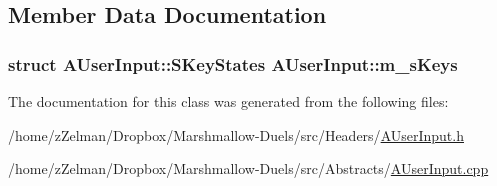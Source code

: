 \subsection{Member Data Documentation}
\hypertarget{classAUserInput_a55b881326b920413bbcdf6e02c4fb021}{
\subsubsection[{m\-\_\-s\-Keys}]{\setlength{\rightskip}{0pt plus 5cm}struct {\bf A\-User\-Input\-::\-S\-Key\-States}  A\-User\-Input\-::m\-\_\-s\-Keys\hspace{0.3cm}{\ttfamily [protected]}}}\label{classAUserInput_a55b881326b920413bbcdf6e02c4fb021}


The documentation for this class was generated from the following files\-:\begin{DoxyCompactItemize}
\item 
/home/z\-Zelman/\-Dropbox/\-Marshmallow-\/\-Duels/src/\-Headers/\hyperlink{AUserInput_8h}{A\-User\-Input.\-h}\item 
/home/z\-Zelman/\-Dropbox/\-Marshmallow-\/\-Duels/src/\-Abstracts/\hyperlink{AUserInput_8cpp}{A\-User\-Input.\-cpp}\end{DoxyCompactItemize}
